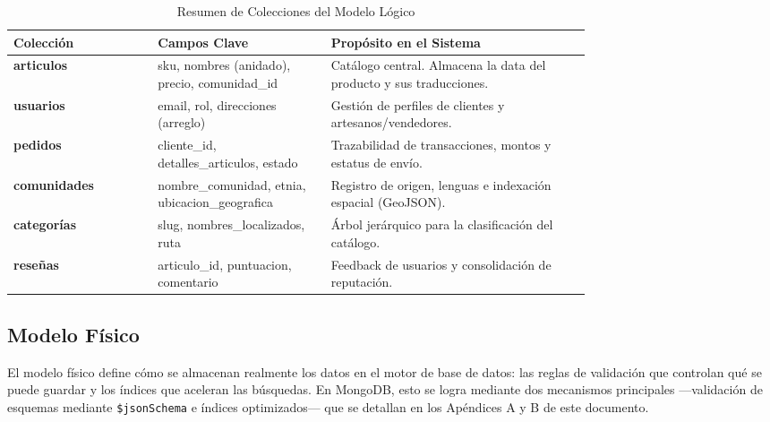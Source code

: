 \documentclass[conference]{IEEEtran}
\begin{document}
\begin{table}[htbp]
\caption{Resumen de Colecciones del Modelo Lógico}
\begin{center}
\footnotesize
\begin{tabular}{|l|p{0.3\linewidth}|p{0.45\linewidth}|}
\hline
\textbf{Colección} & \textbf{Campos Clave} & \textbf{Propósito en el Sistema} \\
\hline
\textbf{articulos} & sku, nombres (anidado), precio, comunidad\_id & Catálogo central. Almacena la data del producto y sus traducciones. \\
\hline
\textbf{usuarios} & email, rol, direcciones (arreglo) & Gestión de perfiles de clientes y artesanos/vendedores. \\
\hline
\textbf{pedidos} & cliente\_id, detalles\_articulos, estado & Trazabilidad de transacciones, montos y estatus de envío. \\
\hline
\textbf{comunidades} & nombre\_co\-mu\-ni\-dad, etnia, ubi\-ca\-cion\_geo\-gra\-fi\-ca & Registro de origen, lenguas e indexación espacial (GeoJSON). \\
\hline
\textbf{categorías} & slug, nombres\_localizados, ruta & Árbol jerárquico para la clasificación del catálogo. \\
\hline
\textbf{reseñas} & articulo\_id, puntuacion, comentario & Feedback de usuarios y consolidación de reputación. \\
\hline
\end{tabular}
\label{tab:colecciones}
\end{center}
\end{table}

\subsection{Modelo Físico}
El modelo físico define cómo se almacenan realmente los datos en el motor de base de datos: las reglas de validación que controlan qué se puede guardar y los índices que aceleran las búsquedas. En MongoDB, esto se logra mediante dos mecanismos principales —validación de esquemas mediante \texttt{\$jsonSchema} e índices optimizados— que se detallan en los Apéndices A y B de este documento.
\end{document}
